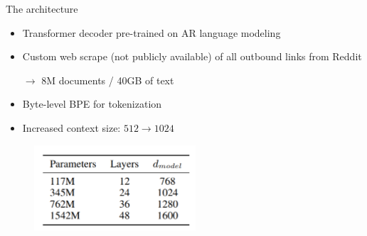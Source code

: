 \begin{frame}{The architecture}

\vfill

\begin{itemize}
	\item Transformer decoder pre-trained on AR language modeling
	\item Custom web scrape (not publicly available) of all outbound links from Reddit
	\item[$\to$] 8M documents / 40GB of text
	\item Byte-level BPE for tokenization
	\item Increased context size: $512 \to 1024$
\end{itemize}

\begin{figure}
\centering
\includegraphics[width = 6cm]{figure/72-gpt2-size.png}\\ 
\end{figure}

\vfill

\end{frame}


